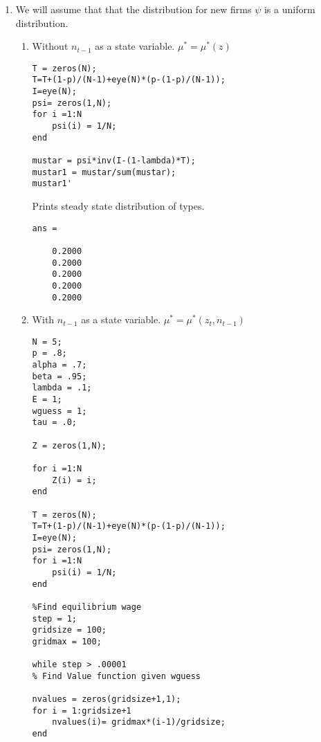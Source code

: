 \documentclass[12pt]{article}
\begin{document}
\begin{onehalfspace}
\begin{enumerate}[1.]
\begin{lstlisting}
Z = zeros(1,N);
nstar = zeros(N,1);
for i =1:N
    Z(i) = i;
    nstar(i) = (w/(Z(i)*alpha))^(1/(alpha-1));
end

nstar
    \end{lstlisting}
    Prints $n^*$:
    \begin{lstlisting}
nstar =

    0.3046
    3.0697
   11.8594
   30.9405
   65.0969
    \end{lstlisting}
    The aggregate labor input is:
    $\sum\limits_{z}\mu_t(z) n^*(z)$
    Or in matrix notation: $\mu_t n^*$ where $\mu_t$ is the 1xN measure over types and $n^*$ is the the Nx1 vector of optimal employment over types. Since the distribution of firms is uniform over firm types (see part 2) the aggregate labor input is $Number\ of\ firms*\sum\limits_{z}.2 *n^*(z) = Number\ of\ firms*22.2542$.
    \item
    We will assume that that the distribution for new firms $\psi$ is a uniform distribution.
    \begin{enumerate}
        \item Without $n_{t-1}$ as a state variable. $\mu^*=\mu^*(z)$
        \begin{lstlisting}
T = zeros(N);
T=T+(1-p)/(N-1)+eye(N)*(p-(1-p)/(N-1));
I=eye(N);
psi= zeros(1,N);
for i =1:N
    psi(i) = 1/N;
end

mustar = psi*inv(I-(1-lambda)*T);
mustar1 = mustar/sum(mustar);
mustar1'
    \end{lstlisting}
Prints steady state distribution of types.
\begin{lstlisting}
ans =

    0.2000
    0.2000
    0.2000
    0.2000
    0.2000
\end{lstlisting}
        \item With $n_{t-1}$ as a state variable. $\mu^*=\mu^*(z_t, n_{t-1})$
        \begin{lstlisting}
N = 5;
p = .8;
alpha = .7;
beta = .95;
lambda = .1;
E = 1;
wguess = 1;
tau = .0;

Z = zeros(1,N);

for i =1:N
    Z(i) = i;
end

T = zeros(N);
T=T+(1-p)/(N-1)+eye(N)*(p-(1-p)/(N-1));
I=eye(N);
psi= zeros(1,N);
for i =1:N
    psi(i) = 1/N;
end

%Find equilibrium wage
step = 1;
gridsize = 100;
gridmax = 100;

while step > .00001
% Find Value function given wguess

nvalues = zeros(gridsize+1,1);
for i = 1:gridsize+1
    nvalues(i)= gridmax*(i-1)/gridsize; 
end


\end{lstlisting}
\end{enumerate}
\end{enumerate}
\end{onehalfspace}
\end{document}

